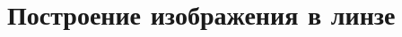 \documentclass[main.tex]{subfiles}
\begin{document}

\pagestyle{empty}

 

\setcounter{section}{7
}
\addtocounter{section}{-1} 

\section{Построение изображения в линзе}


%











\end{document}
